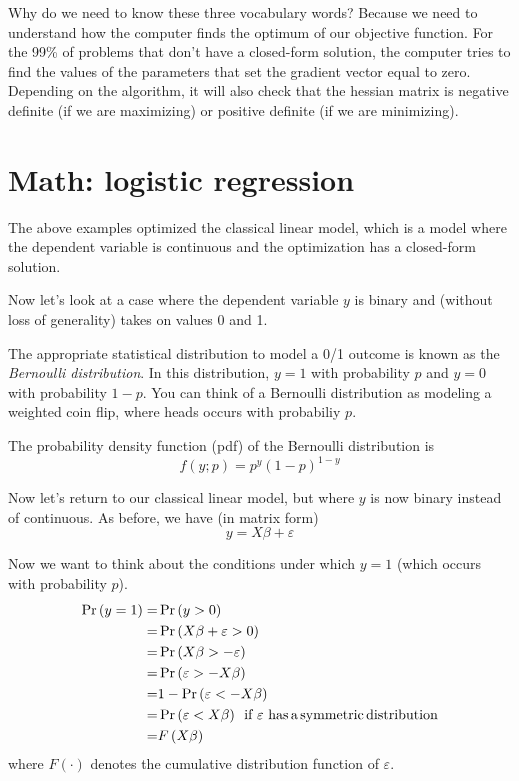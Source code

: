 \documentclass[12pt,english]{article}
\begin{document}
Why do we need to know these three vocabulary words? Because we need to understand how the computer finds the optimum of our objective function. For the 99\% of problems that don't have a closed-form solution, the computer tries to find the values of the parameters that set the gradient vector equal to zero. Depending on the algorithm, it will also check that the hessian matrix is negative definite (if we are maximizing) or positive definite (if we are minimizing). 

\section{Math: logistic regression}
The above examples optimized the classical linear model, which is a model where the dependent variable is continuous and the optimization has a closed-form solution.

Now let's look at a case where the dependent variable $y$ is binary and (without loss of generality) takes on values 0 and 1.

The appropriate statistical distribution to model a 0/1 outcome is known as the \emph{Bernoulli distribution}. In this distribution, $y=1$ with probability $p$ and $y=0$ with probability $1-p$. You can think of a Bernoulli distribution as modeling a weighted coin flip, where heads occurs with probabiliy $p$.

The probability density function (pdf) of the Bernoulli distribution is
\[
    f\left(y;p\right) = p^{y}\left(1-p\right)^{1-y}
\]

Now let's return to our classical linear model, but where $y$ is now binary instead of continuous. As before, we have (in matrix form)
\[
y = X\beta + \varepsilon
\]

Now we want to think about the conditions under which $y=1$ (which occurs with probability $p$).
\begin{align*}
    \Pr\left(y=1\right) =& \Pr\left(y>0\right) \\
                        =& \Pr\left(X\beta + \varepsilon > 0\right) \\
                        =& \Pr\left(X\beta > -\varepsilon \right) \\
                        =& \Pr\left(\varepsilon > -X\beta \right) \\
    =& 1-\Pr\left(\varepsilon < -X\beta \right) \\
    =& \Pr\left(\varepsilon < X\beta \right)\,\,\,\text{if}\,\,\varepsilon\,\,\text{has\,a\,symmetric\,distribution} \\
    =& F\left(X\beta\right)
\end{align*}
where $F\left(\cdot\right)$ denotes the cumulative distribution function of $\varepsilon$.
\end{document}
